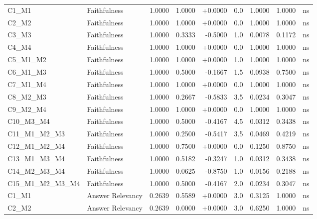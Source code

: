 \begin{table}[p]
\begin{tabular*}{\textwidth}{@{\extracolsep{\fill}} l l r r r r r r c @{}}
\addlinespace
C1\_M1          & Faithfulness         & 1.0000 & 1.0000 & +0.0000 & 0.0 & 1.0000 & 1.0000 & ns \\
\addlinespace
C2\_M2          & Faithfulness         & 1.0000 & 1.0000 & +0.0000 & 0.0 & 1.0000 & 1.0000 & ns \\
\addlinespace
C3\_M3          & Faithfulness         & 1.0000 & 0.3333 & -0.5000 & 1.0 & 0.0078 & 0.1172 & ns \\
\addlinespace
C4\_M4          & Faithfulness         & 1.0000 & 1.0000 & +0.0000 & 0.0 & 1.0000 & 1.0000 & ns \\
\addlinespace
C5\_M1\_M2      & Faithfulness         & 1.0000 & 1.0000 & +0.0000 & 1.0 & 1.0000 & 1.0000 & ns \\
\addlinespace
C6\_M1\_M3      & Faithfulness         & 1.0000 & 0.5000 & -0.1667 & 1.5 & 0.0938 & 0.7500 & ns \\
\addlinespace
C7\_M1\_M4      & Faithfulness         & 1.0000 & 1.0000 & +0.0000 & 0.0 & 1.0000 & 1.0000 & ns \\
\addlinespace
C8\_M2\_M3      & Faithfulness         & 1.0000 & 0.2667 & -0.5833 & 3.5 & 0.0234 & 0.3047 & ns \\
\addlinespace
C9\_M2\_M4      & Faithfulness         & 1.0000 & 1.0000 & +0.0000 & 0.0 & 1.0000 & 1.0000 & ns \\
\addlinespace
C10\_M3\_M4     & Faithfulness         & 1.0000 & 0.5000 & -0.4167 & 4.5 & 0.0312 & 0.3438 & ns \\
\addlinespace
C11\_M1\_M2\_M3 & Faithfulness         & 1.0000 & 0.2500 & -0.5417 & 3.5 & 0.0469 & 0.4219 & ns \\
\addlinespace
C12\_M1\_M2\_M4 & Faithfulness         & 1.0000 & 0.7500 & +0.0000 & 0.0 & 0.1250 & 0.8750 & ns \\
\addlinespace
C13\_M1\_M3\_M4 & Faithfulness         & 1.0000 & 0.5182 & -0.3247 & 1.0 & 0.0312 & 0.3438 & ns \\
\addlinespace
C14\_M2\_M3\_M4 & Faithfulness         & 1.0000 & 0.0625 & -0.8750 & 1.0 & 0.0156 & 0.2188 & ns \\
\addlinespace
C15\_M1\_M2\_M3\_M4 & Faithfulness         & 1.0000 & 0.5000 & -0.4167 & 2.0 & 0.0234 & 0.3047 & ns \\
\addlinespace
C1\_M1          & Answer Relevancy     & 0.2639 & 0.5589 & +0.0000 & 3.0 & 0.3125 & 1.0000 & ns \\
\addlinespace
C2\_M2          & Answer Relevancy     & 0.2639 & 0.0000 & +0.0000 & 3.0 & 0.6250 & 1.0000 & ns \\

\end{tabular*}
\end{table}
